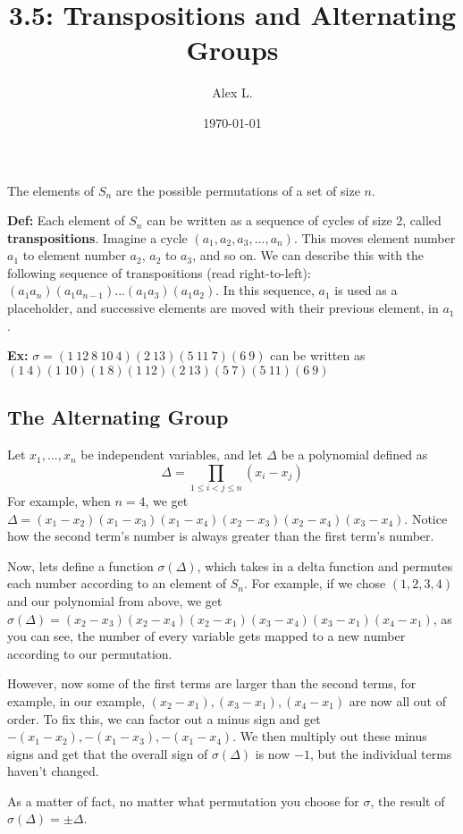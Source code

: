 \documentclass{article}
\title{3.5: Transpositions and Alternating Groups}
\author{Alex L.}
\date{\today}
\begin{document}
\maketitle

The elements of $S_n$ are the possible permutations of a set of size $n$. 

\textbf{Def:} Each element of $S_n$ can be written as a sequence of cycles of size 2, called \textbf{transpositions}. Imagine a cycle $(a_1,a_2,a_3,...,a_n)$. This moves element number $a_1$ to element number $a_2$, $a_2$ to $a_3$, and so on. We can describe this with the following sequence of transpositions (read right-to-left): $(a_1a_n)(a_1a_{n-1})...(a_1a_3)(a_1a_2)$. In this sequence, $a_1$ is used as a placeholder, and successive elements are moved with their previous element, in $a_1$. 

\textbf{Ex:} $\sigma = (1\ 12\ 8\ 10\ 4)(2\ 13)(5\ 11\ 7)(6\ 9)$ can be written as $(1\ 4)(1\ 10)(1\ 8)(1\ 12)(2\ 13)(5\ 7)(5\ 11)(6\ 9)$

\subsection{The Alternating Group}

Let $x_1, ... ,x_n$ be independent variables, and let $\Delta$ be a polynomial defined as $$\Delta = \prod_{1\leq i < j \leq n} (x_i - x_j)$$For example, when $n = 4$, we get $\Delta = (x_1 - x_2)(x_1 - x_3)(x_1-x_4)(x_2 - x_3)(x_2 - x_4)(x_3 - x_4)$. Notice how the second term's number is always greater than the first term's number. 

Now, lets define a function $\sigma(\Delta)$, which takes in a delta function and permutes each number according to an element of $S_n$. For example, if we chose $(1,2,3,4)$ and our polynomial from above, we get $\sigma(\Delta) = (x_2 - x_3)(x_2 - x_4)(x_2 - x_1)(x_3 - x_4)(x_3-x_1)(x_4 - x_1)$, as you can see, the number of every variable gets mapped to a new number according to our permutation.

However, now some of the first terms are larger than the second terms, for example, in our example, $(x_2 - x_1), (x_3 - x_1), (x_4-x_1)$ are now all out of order. To fix this, we can factor out a minus sign and get $-(x_1 - x_2), -(x_1 - x_3), - (x_1 - x_4)$. We then multiply out these minus signs and get that the overall sign of $\sigma(\Delta)$ is now $-1$, but the individual terms haven't changed. 

As a matter of fact, no matter what permutation you choose for $\sigma$, the result of $\sigma(\Delta) = \pm \Delta$.
\end{document}
